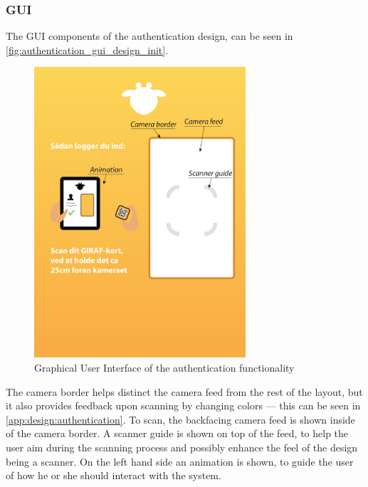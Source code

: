 \subsubsection{GUI}
The GUI components of the authentication design, can be seen in \autoref{fig:authentication_gui_design_init}.
\begin{figure}[h]
	\centering
	\includegraphics[width=0.7\textwidth]{gfx/authentication_gui_design_init.pdf}
	\caption{Graphical User Interface of the authentication functionality}
	\label{fig:authentication_gui_design_init}
\end{figure}
The camera border helps distinct the camera feed from the rest of the layout, but it also provides feedback upon scanning by changing colors --- this can be seen in \autoref{app:design:authentication}. To scan, the backfacing camera feed is shown inside of the camera border. A scanner guide is shown on top of the feed, to help the user aim during the scanning process and possibly enhance the feel of the design being a scanner. On the left hand side an animation is shown, to guide the user of how he or she should interact with the system. 